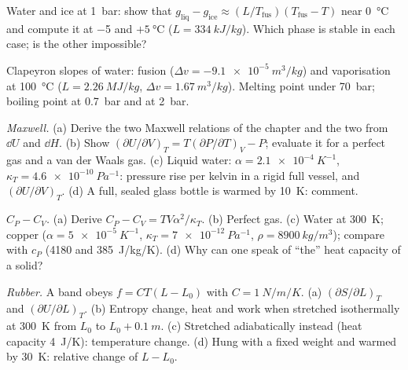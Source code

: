 \begin{exercise}[$\star$]\label{exo:b2:thermodynamic-potentials:3}
Water and ice at \qty{1}{bar}: show that $g_{\text{liq}} - g_{\text{ice}} \approx
(L/T_{\text{fus}})(T_{\text{fus}} - T)$ near \qty{0}{\celsius} and compute it
at \qty{-5}{} and $+\qty{5}{\celsius}$ ($L = \qty{334}{kJ/kg}$). Which phase is
stable in each case; is the other impossible?
\end{exercise}

\begin{exercise}[$\star$]\label{exo:b2:thermodynamic-potentials:4}
Clapeyron slopes of water: fusion ($\Delta v = -\qty{9.1e-5}{m^3/kg}$) and
vaporisation at \qty{100}{\celsius} ($L = \qty{2.26}{MJ/kg}$, $\Delta v =
\qty{1.67}{m^3/kg}$). Melting point under \qty{70}{bar}; boiling point at
\qty{0.7}{bar} and at \qty{2}{bar}.
\end{exercise}

\begin{exercise}[$\star\star$]\label{exo:b2:thermodynamic-potentials:5}
\emph{Maxwell.} (a) Derive the two Maxwell relations of the chapter
and the two from $\dd U$ and $\dd H$. (b) Show $(\partial U/\partial V)_T =
T(\partial P/\partial T)_V - P$; evaluate it for a perfect gas and a van
der Waals gas. (c) Liquid water: $\alpha = \qty{2.1e-4}{K^{-1}}$, $\kappa_T =
\qty{4.6e-10}{Pa^{-1}}$: pressure rise per kelvin in a rigid full vessel,
and $(\partial U/\partial V)_T$. (d) A full, sealed glass bottle is warmed
by \qty{10}{K}: comment.
\end{exercise}

\begin{exercise}[$\star\star$]\label{exo:b2:thermodynamic-potentials:6}
\emph{$C_P - C_V$.} (a) Derive $C_P - C_V = TV\alpha^2/\kappa_T$. (b)
Perfect gas. (c) Water at \qty{300}{K}; copper ($\alpha = \qty{5e-5}{K^{-1}}$,
$\kappa_T = \qty{7e-12}{Pa^{-1}}$, $\rho = \qty{8900}{kg/m^3}$); compare with
$c_P$ (\qty{4180}{} and \qty{385}{J/kg/K}). (d) Why can one speak of
``the'' heat capacity of a solid?
\end{exercise}

\begin{exercise}[$\star\star$]\label{exo:b2:thermodynamic-potentials:7}
\emph{Rubber.} A band obeys $f = CT(L - L_0)$ with $C = \qty{1}{N/m/K}$.
(a) $(\partial S/\partial L)_T$ and $(\partial U/\partial L)_T$. (b) Entropy
change, heat and work when stretched isothermally at \qty{300}{K} from
$L_0$ to $L_0 + \qty{0.1}{m}$. (c) Stretched adiabatically instead (heat
capacity \qty{4}{J/K}): temperature change. (d) Hung with a fixed weight
and warmed by \qty{30}{K}: relative change of $L - L_0$.
\end{exercise}


